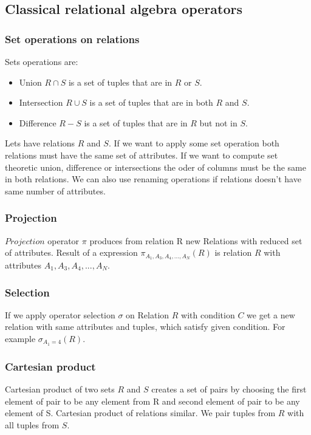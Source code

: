 \subsection{Classical relational algebra operators}
\subsubsection{Set operations on relations}

Sets operations are:
\begin{itemize}
\item Union $R\cap S$ is a set of tuples that are in $R$ or $S$.
\item Intersection $R\cup S$  is a set of tuples that are in both $R$ and $S$. 
\item Difference $R-S$ is a set of tuples that are in $R$ but not in $S$.

\end{itemize}

Lets have relations $R$ and $S$. If we want to apply some set operation both relations must have the same set of attributes. If we want to compute set theoretic union, difference or intersections the oder of columns must be the same in both relations. 
We can also use renaming operations if relations doesn't have same number of attributes.

\subsubsection{Projection}
\label{projection}
$Projection$ operator $\pi$ produces from relation R new Relations with reduced set of attributes. Result of a expression $\pi_{A_1,A_3,A_4,...,A_N}(R)$ is relation $R$ with attributes $A_1,A_3,A_4,...,A_N$. 

\subsubsection{Selection}
If we apply operator selection $\sigma$ on Relation $R$ with condition $C$ we get a new relation with same attributes and tuples, which satisfy given condition. For example $\sigma_{A_1=4}(R)$.

\subsubsection{Cartesian product}
Cartesian product of two sets $R$ and $S$ creates a set of pairs by choosing the first element of pair to be any element from R and second element of pair to be any element of S. Cartesian product of relations similar. We pair tuples from $R$ with all tuples from $S$.

